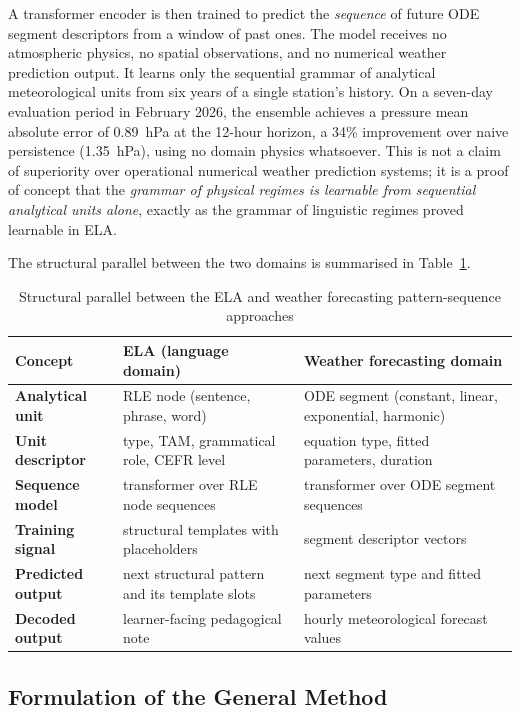 \documentclass[12pt,a4paper,oneside]{report}
\begin{document}
A transformer encoder is then trained to predict the \emph{sequence} of future ODE segment
descriptors from a window of past ones. The model receives no atmospheric physics, no
spatial observations, and no numerical weather prediction output. It learns only the
sequential grammar of analytical meteorological units from six years of a single station's
history. On a seven-day evaluation period in February 2026, the ensemble achieves a
pressure mean absolute error of 0.89~hPa at the 12-hour horizon, a 34\% improvement
over naive persistence (1.35~hPa), using no domain physics whatsoever. This is not a
claim of superiority over operational numerical weather prediction systems; it is a proof
of concept that the \emph{grammar of physical regimes is learnable from sequential
analytical units alone}, exactly as the grammar of linguistic regimes proved learnable in
ELA.

The structural parallel between the two domains is summarised in Table~\ref{tab:domainparallel}.

\begin{table}[H]
  \centering
  \caption{Structural parallel between the ELA and weather forecasting pattern-sequence approaches}
  \label{tab:domainparallel}
  \begin{tabularx}{\textwidth}{>{\bfseries}p{3.5cm}X X}
    \toprule
    Concept & ELA (language domain) & Weather forecasting domain \\
    \midrule
    Analytical unit &
      RLE node (sentence, phrase, word) &
      ODE segment (constant, linear, exponential, harmonic) \\
    Unit descriptor &
      type, TAM, grammatical role, CEFR level &
      equation type, fitted parameters, duration \\
    Sequence model &
      transformer over RLE node sequences &
      transformer over ODE segment sequences \\
    Training signal &
      structural templates with placeholders &
      segment descriptor vectors \\
    Predicted output &
      next structural pattern and its template slots &
      next segment type and fitted parameters \\
    Decoded output &
      learner-facing pedagogical note &
      hourly meteorological forecast values \\
    \bottomrule
  \end{tabularx}
\end{table}

\subsection*{Formulation of the General Method}
\end{document}
